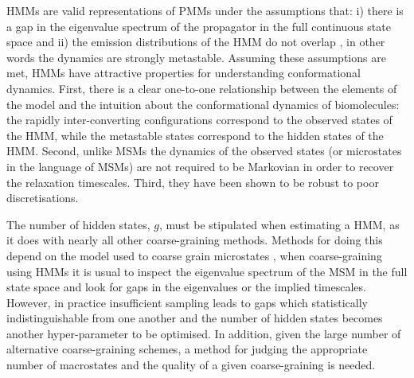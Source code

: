 HMMs are valid representations of PMMs under the assumptions that: i) there is a gap in the eigenvalue spectrum of the propagator in the full continuous state space and ii) the emission distributions of the HMM do not overlap , in other words the dynamics are strongly metastable.\cite{noeProjectedHiddenMarkov2013a} Assuming these assumptions are met, HMMs have attractive properties for understanding conformational dynamics.  First, there is a clear one-to-one relationship between the elements of the model and the intuition about the conformational dynamics of biomolecules: the rapidly inter-converting configurations correspond to the observed states of the HMM, while the metastable states correspond to the hidden states of the HMM. Second, unlike MSMs the dynamics of the observed states (or microstates in the language of MSMs) are not required to be Markovian in order to recover the relaxation timescales. Third, they have been shown to be robust to poor discretisations. \cite{noeProjectedHiddenMarkov2013a}

The number of hidden states, $g$, must be stipulated when estimating a HMM, as it does with nearly all other coarse-graining methods. Methods for doing this depend on the model used to coarse grain microstates \cite{bowmanQuantitativeComparisonAlternative2013}, when coarse-graining using HMMs  it is usual to inspect the eigenvalue spectrum of the MSM in the full state space and look for gaps in the eigenvalues or the implied timescales.\cite{noeProjectedHiddenMarkov2013a} However, in practice insufficient sampling leads to gaps which statistically indistinguishable from one another and the number of hidden states becomes another hyper-parameter to be optimised. \cite{bowmanQuantitativeComparisonAlternative2013} In addition, given the large number of alternative coarse-graining schemes, a method for judging the appropriate number of macrostates and the quality of a given coarse-graining  is needed. 

